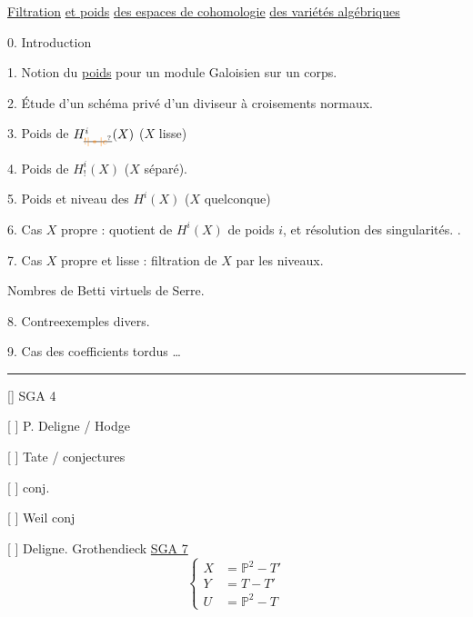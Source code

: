  

\uline{Filtration} \uline{et poids} \uline{ des espaces de cohomologie} \uline{des variétés algébriques}

0. Introduction

1. Notion du \uline{poids}  pour un module  Galoisien sur un corps. 

2. Étude d'un schéma privé d'un diviseur à croisements normaux.

3. Poids  de $H_{\deleted{\unsure{!|*|c}}}^{i}(X)$ ($X$ lisse)

4. Poids  de $H^{i}_{!}(X)$ ($X$ séparé). 

 5. Poids et niveau des $H^i(X)$ ($X$ quelconque)

6. Cas $X$ propre :  quotient de $H^i(X)$ de poids $i$, et résolution des singularités. .

7. Cas $X$ propre et lisse : filtration de $X$ par les niveaux.

 Nombres de Betti virtuels de Serre.

8. Contre\unsure{-}exemples divers.

9. Cas des coefficients tordus \ldots

\noindent\rule{\linewidth}{0.4pt}

[] SGA 4

[ ] P. Deligne / Hodge

[ ] Tate / conjectures

[ ]  \quad conj. 

[ ] Weil \quad conj

[ ] Deligne. Grothendieck \quad \uline{SGA 7}
\[
\left\{\begin{aligned}
 X&=\mathbb{P}^{2}-T'\\
 Y&=T-T'\\
 U&=\mathbb{P}^{2}-T
\end{aligned}\right.
\]


